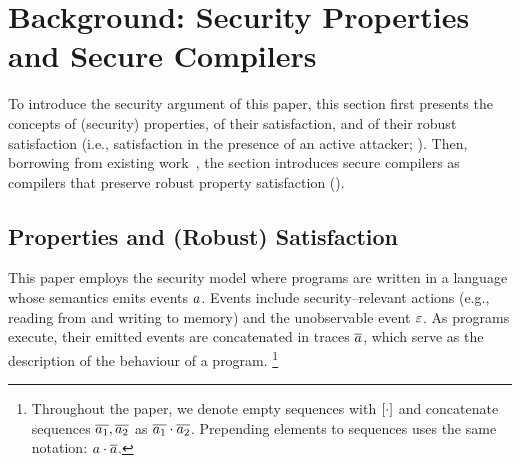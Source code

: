 \documentclass[utf8,acmsmall,review,screen,dvipsnames]{acmart}
\begin{document}
\section{Background: Security Properties and Secure Compilers}\label{sec:background}

To introduce the security argument of this paper, this section first presents the concepts of (security) properties, of their satisfaction, and of their robust satisfaction (i.e., satisfaction in the presence of an active attacker; ).
Then, borrowing from existing work~\cite{abate2019jour,abate2021extacc,patrignani2021rsc}, the section introduces secure compilers as compilers that preserve robust property satisfaction ().

\subsection{Properties and (Robust) Satisfaction}\label{subsec:bg:tprop}

This paper employs the security model where programs are written in a language whose semantics emits events $\event$.
Events include security--relevant actions (e.g., reading from and writing to memory) and the unobservable event $\emptyevent$.
As programs execute, their emitted events are concatenated in traces $\trace$, which serve as the description of the behaviour of a program.%
\footnote{
Throughout the paper, we denote empty sequences with $\hole{\cdot}$ and concatenate sequences $\trace[_{1}],\trace[_{2}]$ as $\trace[_{1}]\cdot\trace[_{2}]$.
Prepending elements to sequences uses the same notation: $\event\cdot\trace$.
}
\end{document}
